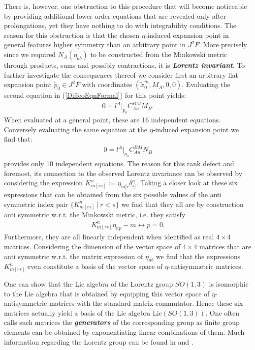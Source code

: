 \documentclass[a4paper,12pt, DIV=14, BCOR=5mm, twoside, headsepline, numbers=noenddot]{scrbook}
\begin{document}
There is, however, one obstruction to this procedure that will become noticeable by providing additional lower order equations that are revealed only after prolongations, yet they have nothing to do with integrability conditions. 
The reason for this obstruction is that the chosen $\eta$-induced expansion point in general features higher symmetry than an arbitrary point in $J^2F$. More precisely since we required $N_A(\eta_{ab})$ to be constructed from the Minkowski metric through products, sums and possibly contractions, it is \textit{\textbf{Lorentz invariant}}. To further investigate the consequences thereof we consider first an arbitrary flat expansion point $\tilde{p}_0 \in J^2F$ with coordinates $(\tilde{x}_0^m,M_A,0,0)$. Evaluating the second equation in (\ref{DiffeoEqnFormal}) for this point yields:
\begin{align}
    0 = l^A \vert _{\tilde{p}_0} C^{BM}_{An}M_B.
\end{align}
When evaluated at a general point, these are 16 independent equations. 
Conversely evaluating the same equation at the $\eta$-induced expansion point we find that:
\begin{align}\label{RankDef}
    0 = l^A \vert_{p_0} C^{BM}_{An}N_B
\end{align}
provides only 10 independent equations. The reason for this rank defect and foremost, its connection to the observed Lorentz invariance can be observed by considering the expression $K_{m[rs]}^n :=\eta_{m[r}\delta_{s]}^n$. 
Taking a closer look at these six expressions that can be obtained from the six possible values of the anti symmetric index pair  $\{K_{m[rs]}^n \ \vert \ r < s \} $ we find that they all are by construction anti symmetric w.r.t. the Minkowski metric, i.e. they satisfy 
\begin{align}
K_{m[rs]}^n\eta_{n p} - m \leftrightarrow p = 0.
\end{align}
Furthermore, they are all linearly independent when identified as real $4 \times 4$ matrices. Considering the dimension of the vector space of $4 \times 4$ matrices that are anti symmetric w.r.t. the matrix expression of $\eta_{ab}$ we find that  the expressions $K_{m[rs]}^n$ even constitute a basis of the vector space of $\eta$-antisymmetric matrices. 

One can show that the Lie algebra of the Lorentz group $SO(1,3)$ is isomorphic to the Lie algebra that is obtained by equipping this vector space of $\eta$-antisymmetric matrices with the standard matrix commutator. Hence these six matrices actually yield a basis of the Lie algebra $\mathrm{Lie}(SO(1,3))$. One often calls such matrices the \textit{\textbf{generators}} of the corresponding group as finite group elements can be obtained by exponentiating linear combinations of them. Much information regarding the Lorentz group can be found in \cite{doi:10.1142/p199} and \cite{naimark2014linear}.
\end{document}
